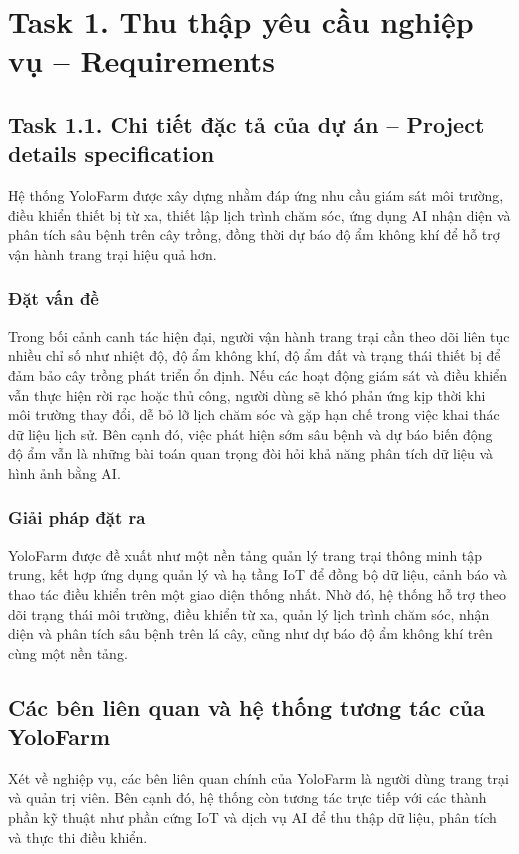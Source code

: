 \section{Task 1. Thu thập yêu cầu nghiệp vụ -- Requirements}

\subsection{Task 1.1. Chi tiết đặc tả của dự án -- Project details specification}
\indent Hệ thống YoloFarm được xây dựng nhằm đáp ứng nhu cầu giám sát môi trường, điều khiển thiết bị từ xa, thiết lập lịch trình chăm sóc, ứng dụng AI nhận diện và phân tích sâu bệnh trên cây trồng, đồng thời dự báo độ ẩm không khí để hỗ trợ vận hành trang trại hiệu quả hơn.

\subsubsection{Đặt vấn đề}
\indent Trong bối cảnh canh tác hiện đại, người vận hành trang trại cần theo dõi liên tục nhiều chỉ số như nhiệt độ, độ ẩm không khí, độ ẩm đất và trạng thái thiết bị để đảm bảo cây trồng phát triển ổn định. Nếu các hoạt động giám sát và điều khiển vẫn thực hiện rời rạc hoặc thủ công, người dùng sẽ khó phản ứng kịp thời khi môi trường thay đổi, dễ bỏ lỡ lịch chăm sóc và gặp hạn chế trong việc khai thác dữ liệu lịch sử. Bên cạnh đó, việc phát hiện sớm sâu bệnh và dự báo biến động độ ẩm vẫn là những bài toán quan trọng đòi hỏi khả năng phân tích dữ liệu và hình ảnh bằng AI.

\subsubsection{Giải pháp đặt ra}
\indent YoloFarm được đề xuất như một nền tảng quản lý trang trại thông minh tập trung, kết hợp ứng dụng quản lý và hạ tầng IoT để đồng bộ dữ liệu, cảnh báo và thao tác điều khiển trên một giao diện thống nhất. Nhờ đó, hệ thống hỗ trợ theo dõi trạng thái môi trường, điều khiển từ xa, quản lý lịch trình chăm sóc, nhận diện và phân tích sâu bệnh trên lá cây, cũng như dự báo độ ẩm không khí trên cùng một nền tảng.

\subsection{Các bên liên quan và hệ thống tương tác của YoloFarm}
\indent Xét về nghiệp vụ, các bên liên quan chính của YoloFarm là người dùng trang trại và quản trị viên. Bên cạnh đó, hệ thống còn tương tác trực tiếp với các thành phần kỹ thuật như phần cứng IoT và dịch vụ AI để thu thập dữ liệu, phân tích và thực thi điều khiển.

